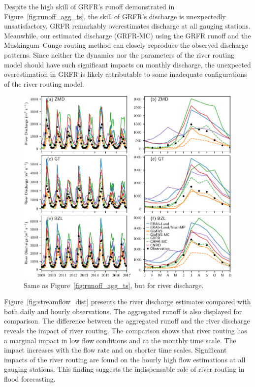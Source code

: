 \documentclass[preprint, review, authoryear, longtitle, 12pt, 3p]{elsarticle}
\begin{document}
Despite the high skill of GRFR's runoff demonstrated in Figure~\ref{fig:runoff_agg_ts}, the skill of GRFR's discharge is unexpectedly unsatisfactory. GRFR remarkably overestimates discharge at all gauging stations. Meanwhile, our estimated discharge (GRFR-MC) using the GRFR runoff and the Muskingum--Cunge routing method can closely reproduce the observed discharge patterns. Since neither the dynamics nor the parameters of the river routing model should have such significant impacts on monthly discharge, the unexpected overestimation in GRFR is likely attributable to some inadequate configurations of the river routing model.

\begin{figure}[ht!]
  \centering
  \includegraphics[width=\textwidth]{streamflow_ts.pdf}
  \caption{Same as Figure~\ref{fig:runoff_agg_ts}, but for river discharge.}
  \label{fig:streamflow_ts}
\end{figure}

Figure~\ref{fig:streamflow_dist} presents the river discharge estimates compared with both daily and hourly observations. The aggregated runoff is also displayed for comparison. The difference between the aggregated runoff and the river discharge reveals the impact of river routing. The comparison shows that river routing has a marginal impact in low flow conditions and at the monthly time scale. The impact increases with the flow rate and on shorter time scales. Significant impacts of the river routing are found on the hourly high flow estimations at all gauging stations. This finding suggests the indispensable role of river routing in flood forecasting.
\end{document}
